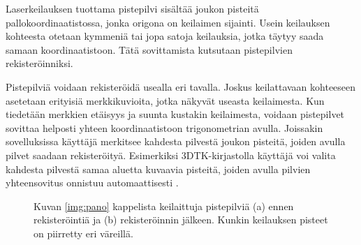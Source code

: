 Laserkeilauksen tuottama pistepilvi sisältää joukon pisteitä pallokoordinaatistossa, jonka origona on keilaimen sijainti. Usein keilauksen kohteesta otetaan kymmeniä tai jopa satoja keilauksia, jotka täytyy saada samaan koordinaatistoon. Tätä sovittamista kutsutaan pistepilvien rekisteröinniksi. 

Pistepilviä voidaan rekisteröidä usealla eri tavalla. Joskus keilattavaan kohteeseen asetetaan erityisiä merkkikuvioita, jotka näkyvät useasta keilaimesta. Kun tiedetään merkkien etäisyys ja suunta kustakin keilaimesta, voidaan pistepilvet sovittaa helposti yhteen koordinaatistoon trigonometrian avulla. Joissakin sovelluksissa käyttäjä merkitsee kahdesta pilvestä joukon pisteitä, joiden avulla pilvet saadaan rekisteröityä. Esimerkiksi 3DTK-kirjastolla käyttäjä voi valita kahdesta pilvestä samaa aluetta kuvaavia pisteitä, joiden avulla pilvien yhteensovitus onnistuu automaattisesti \cite{3dtk}.  

\begin{figure}
    \centering
    
    \caption{Kuvan \ref{img:pano} kappelista keilaittuja pistepilviä (a) ennen rekisteröintiä ja (b) rekisteröinnin jälkeen. Kunkin keilauksen pisteet on piirretty eri väreillä.}
    \label{img:reg}
\end{figure}

